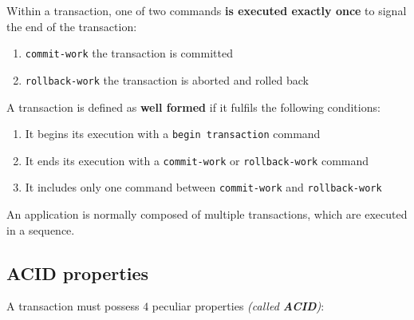 \documentclass[english]{article}
\begin{document}
Within a transaction, one of two commands \textbf{is executed exactly once} to signal the end of the transaction:

\begin{enumerate}
  \item \texttt{commit-work} the transaction is committed
  \item \texttt{rollback-work} the transaction is aborted and rolled back
\end{enumerate}

A transaction is defined as \textbf{well formed} if it fulfils the following conditions:

\begin{enumerate}
  \item It begins its execution with a \texttt{begin transaction} command
  \item It ends its execution with a \texttt{commit-work} or \texttt{rollback-work} command
  \item It includes only one command between \texttt{commit-work} and \texttt{rollback-work}
\end{enumerate}

An application is normally composed of multiple transactions, which are executed in a sequence.

\subsection{ACID properties}

A transaction must possess \(4\) peculiar properties \textit{(called \textbf{ACID})}:
\end{document}
